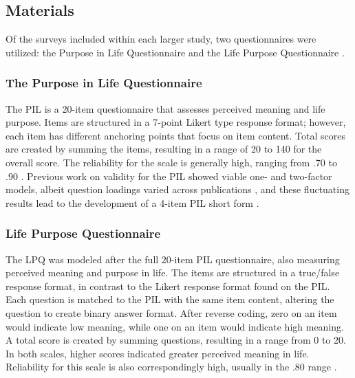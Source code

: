 \documentclass[english,man, mask]{apa6}
\theoremstyle{definition}
\theoremstyle{definition}
\theoremstyle{definition}
\theoremstyle{remark}
\begin{document}
\subsection{Materials}\label{materials}

Of the surveys included within each larger study, two questionnaires
were utilized: the Purpose in Life Questionnaire
\autocite[PIL;][]{Crumbaugh1964} and the Life Purpose Questionnaire
\autocite[LPQ;][]{Hutzell1988}.

\subsubsection{The Purpose in Life
Questionnaire}\label{the-purpose-in-life-questionnaire}

The PIL is a 20-item questionnaire that assesses perceived meaning and
life purpose. Items are structured in a 7-point Likert type response
format; however, each item has different anchoring points that focus on
item content. Total scores are created by summing the items, resulting
in a range of 20 to 140 for the overall score. The reliability for the
scale is generally high, ranging from .70 to .90
\autocites{Schulenberg2004}{Schulenberg2010}. Previous work on validity
for the PIL showed viable one- and two-factor models, albeit question
loadings varied across publications \autocite[see][ for a
summary]{Schulenberg2010}, and these fluctuating results lead to the
development of a 4-item PIL short form \autocite{Schulenberg2011}.

\subsubsection{Life Purpose
Questionnaire}\label{life-purpose-questionnaire}

The LPQ was modeled after the full 20-item PIL questionnaire, also
measuring perceived meaning and purpose in life. The items are
structured in a true/false response format, in contrast to the Likert
response format found on the PIL. Each question is matched to the PIL
with the same item content, altering the question to create binary
answer format. After reverse coding, zero on an item would indicate low
meaning, while one on an item would indicate high meaning. A total score
is created by summing questions, resulting in a range from 0 to 20. In
both scales, higher scores indicated greater perceived meaning in life.
Reliability for this scale is also correspondingly high, usually in the
.80 range \autocites{Melton2008}{Schulenberg2004}.
\end{document}
